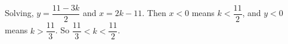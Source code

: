 Solving, $y=\dfrac{11-3k}{2}$ and $x=2k-11$. Then $x<0$ means $k<\dfrac{11}{2}$, and $y<0$ means $k>\dfrac{11}{3}$. So $\boxed{\dfrac{11}{3}<k<\dfrac{11}{2}}$.
